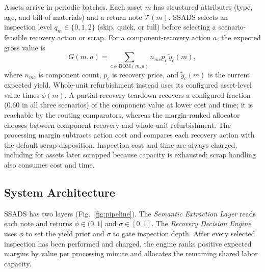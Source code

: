 \documentclass[a4paper,conference]{IEEEtran}
\begin{document}
Assets arrive in periodic batches. Each asset $m$ has structured attributes
(type, age, and bill of materials) and a return note $\mathcal{T}(m)$. SSADS
selects an inspection level $q_m\in\{0,1,2\}$ (skip, quick, or full) before
selecting a scenario-feasible recovery action or scrap. For a component-recovery action $a$,
the expected gross value is
\begin{equation}
  G(m,a) = \sum_{c\in\mathrm{BOM}(m,a)} n_{mc}p_c\,\tilde y_c(m),
  \label{eq:value}
\end{equation}
where $n_{mc}$ is component count, $p_c$ is recovery price, and
$\tilde y_c(m)$ is the current expected yield. Whole-unit refurbishment instead
uses its configured asset-level value times $\phi(m)$. A partial-recovery teardown
recovers a configured fraction (0.60 in all three scenarios) of the component
value at lower cost and time; it is reachable by the routing comparators, whereas
the margin-ranked allocator chooses between component recovery and whole-unit
refurbishment. The processing margin
subtracts action cost and compares each recovery action with the default scrap disposition.
Inspection cost and time are always charged, including for assets later scrapped
because capacity is exhausted; scrap handling also consumes cost and time.

\subsection{System Architecture}

SSADS has two layers (Fig.~\ref{fig:pipeline}). The \emph{Semantic Extraction
Layer} reads each note and returns $\phi\in(0,1]$ and $\sigma\in[0,1]$. The
\emph{Recovery Decision Engine} uses $\phi$ to set the yield prior and $\sigma$ to
gate inspection depth. After every selected inspection has been performed and
charged, the engine ranks positive expected margins by value per processing minute
and allocates the remaining shared labor capacity.
\end{document}
